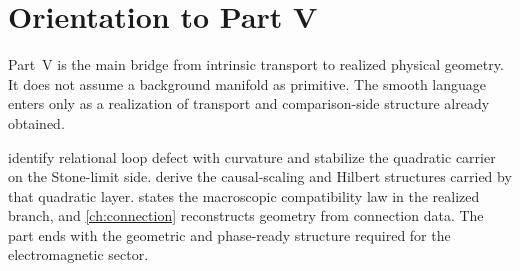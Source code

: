\chapter*{Orientation to Part V}
\label{part:intro-curvature}
\begin{chapterorientation}
\end{chapterorientation}

Part~V is the main bridge from intrinsic transport to realized physical
geometry.  It does not assume a background manifold as primitive.  The
smooth language enters only as a realization of transport and
comparison-side structure already obtained.

 identify relational loop defect with
curvature and stabilize the quadratic carrier on the Stone-limit side.
 derive the causal-scaling and Hilbert
structures carried by that quadratic layer.  
states the macroscopic compatibility law in the realized branch, and
\cref{ch:connection} reconstructs geometry from connection data.  The
part ends with the geometric and phase-ready structure required for the
electromagnetic sector.
